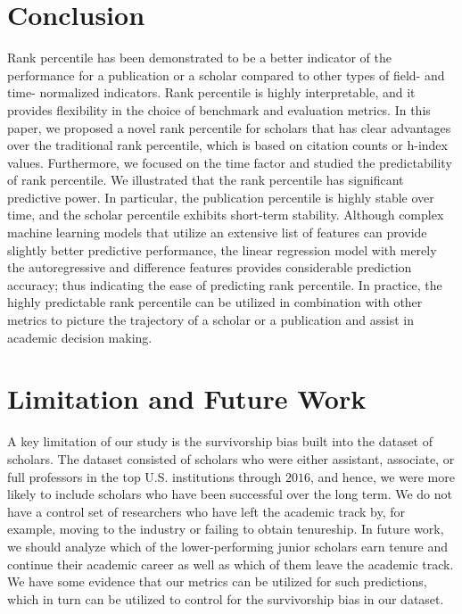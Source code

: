 \section*{Conclusion}

Rank percentile has been demonstrated to be a better indicator of the performance for a publication or a scholar compared to other types of field- and time- normalized indicators. Rank percentile is highly interpretable, and it provides flexibility in the choice of benchmark and evaluation metrics. In this paper, we proposed a novel rank percentile for scholars that has clear advantages over the traditional rank percentile, which is based on citation counts or h-index values. Furthermore, we focused on the time factor and studied the predictability of rank percentile. We illustrated that the rank percentile has significant predictive power. In particular, the publication percentile 
is highly stable over time, and the scholar percentile exhibits short-term stability. Although complex machine learning models that utilize an extensive list of features can provide slightly better predictive performance, the linear regression model with merely the autoregressive and difference features provides considerable prediction accuracy; thus indicating the ease of predicting rank percentile. In practice, the highly predictable rank percentile can be utilized in combination with other metrics to picture the trajectory of a scholar or a publication and assist in academic decision making. 


\section*{Limitation and Future Work}

A key limitation of our study is the survivorship bias built into the dataset of scholars. The dataset consisted of scholars who were either assistant, associate, or full professors in the top U.S. institutions through $2016$, and hence, we were more likely to include scholars who have been successful over the long term. We do not have a control set of researchers who have left the academic track by, for example, moving to the industry or failing to obtain tenureship. In future work, we should analyze which of the lower-performing junior scholars earn tenure and continue their academic career as well as which of them leave the academic track. We have some evidence that our metrics can be utilized for such predictions, which in turn can be utilized to control for the survivorship bias in our dataset.

